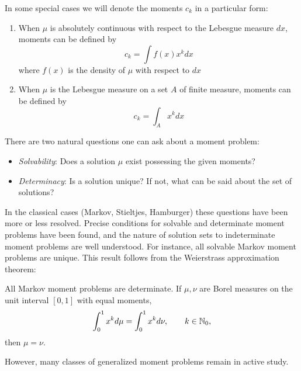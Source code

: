 In some special cases we will denote the moments $c_k$ in a particular form:
\begin{enumerate}
  \item When $\mu$ is absolutely continuous with respect to the Lebesgue measure $dx$, moments can be defined by
  \[
    c_k = \int f(x)x^k dx
  \]
  where $f(x)$ is the density of $\mu$ with respect to $dx$
  \item When $\mu$ is the Lebesgue measure on a set $A$ of finite measure, moments can be defined by
  \[
    c_k = \int_A x^k dx
  \]
\end{enumerate}

There are two natural questions one can ask about a moment problem:
\begin{itemize}[label=]
  \item \emph{Solvability}: Does a solution $\mu$ exist possessing the given moments?
  \item \emph{Determinacy}: Is a solution unique? If not, what can be said about the set of solutions?
\end{itemize}


In the classical cases (Markov, Stieltjes, Hamburger) these questions have been more or less resolved. Precise conditions for solvable and determinate moment problems have been found, and the nature of solution sets to indeterminate moment problems are well understood. For instance, all solvable Markov moment problems are unique. This result follows from the Weierstrass approximation theorem:

\begin{proposition}
  All Markov moment problems are determinate. If $\mu, \nu$ are Borel measures on the unit interval $[0,1]$ with equal moments,
  \[
    \int_0^1 x^k d\mu = \int_0^1 x^k d\nu, \qquad k \in \mathbb{N}_0,
  \]
  then $\mu = \nu$.
\end{proposition}



However, many classes of generalized moment problems remain in active study.

